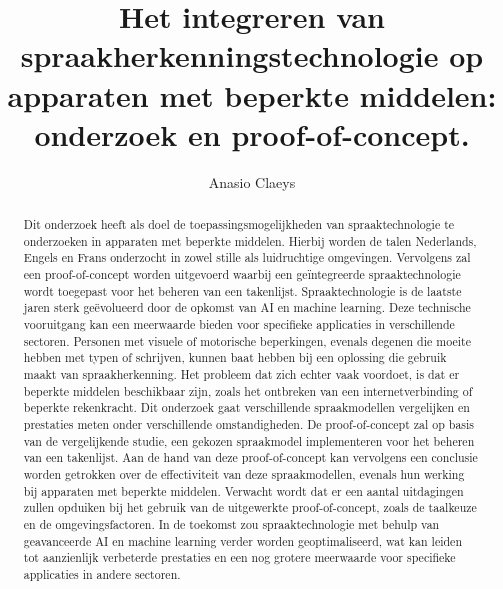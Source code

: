 \documentclass{hogent-article}
\title{Het integreren van spraakherkenningstechnologie op apparaten met beperkte middelen: onderzoek en proof-of-concept.}
\author{Anasio Claeys}
\begin{document}
\begin{abstract}


Dit onderzoek heeft als doel de toepassingsmogelijkheden van spraaktechnologie te onderzoeken in apparaten met beperkte middelen.
Hierbij worden de talen Nederlands, Engels en Frans onderzocht in zowel stille als luidruchtige omgevingen.
Vervolgens zal een 
proof-of-concept worden uitgevoerd waarbij een geïntegreerde spraaktechnologie wordt toegepast voor het beheren van een takenlijst.
Spraaktechnologie is de laatste jaren sterk geëvolueerd door de opkomst van AI en machine learning.
Deze technische vooruitgang kan een meerwaarde bieden voor specifieke applicaties in verschillende sectoren. Personen met visuele of 
motorische beperkingen, evenals degenen die moeite hebben met typen of schrijven, kunnen baat hebben bij een oplossing die gebruik maakt van 
spraakherkenning.
Het probleem dat zich echter vaak voordoet, is dat er beperkte middelen beschikbaar zijn, zoals het ontbreken van een internetverbinding of beperkte rekenkracht. 
Dit onderzoek gaat verschillende spraakmodellen
vergelijken en prestaties meten onder verschillende omstandigheden. De proof-of-concept zal op basis van de vergelijkende studie,
een gekozen spraakmodel implementeren voor het beheren van een takenlijst. Aan de hand van deze proof-of-concept kan vervolgens een conclusie worden getrokken over
de effectiviteit van deze spraakmodellen, evenals hun werking bij apparaten met beperkte middelen. Verwacht wordt dat er een aantal uitdagingen zullen
opduiken bij het gebruik van de uitgewerkte proof-of-concept, zoals de taalkeuze en de omgevingsfactoren. In de toekomst zou
spraaktechnologie met behulp van geavanceerde AI en machine learning verder worden geoptimaliseerd, wat kan leiden tot aanzienlijk verbeterde prestaties en een nog grotere meerwaarde voor specifieke applicaties in andere sectoren.

\end{abstract}

\tableofcontents



\printbibliography[heading=bibintoc]
\end{document}
